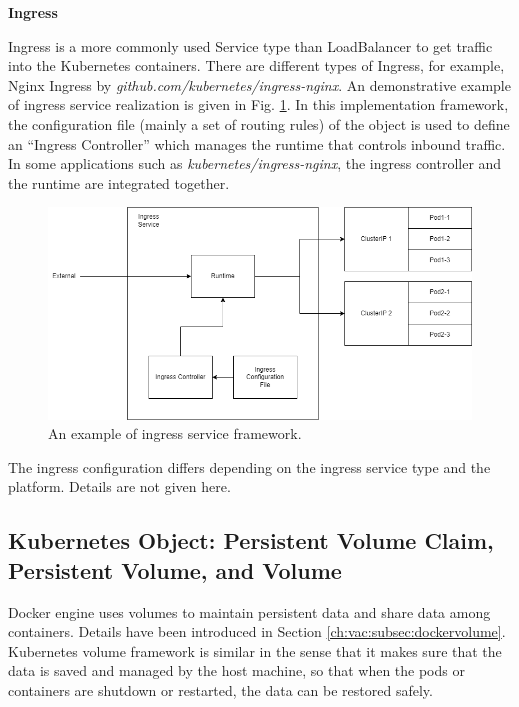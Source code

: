 \vspace{0.1in}
\noindent \textbf{Ingress}
\vspace{0.1in}

Ingress is a more commonly used Service type than LoadBalancer to get traffic into the Kubernetes containers. There are different types of Ingress, for example, Nginx Ingress by \textit{github.com/kubernetes/ingress-nginx}. An demonstrative example of ingress service realization is given in Fig. \ref{ch:vac:fig:ingress_service}. In this implementation framework, the configuration file (mainly a set of routing rules) of the object is used to define an ``Ingress Controller'' which manages the runtime that controls inbound traffic. In some applications such as \textit{kubernetes/ingress-nginx}, the ingress controller and the runtime are integrated together.

\begin{figure}[htbp]
	\centering
	\includegraphics[width=350pt]{chapters/part-3/figures/ingress_service.png}
	\caption{An example of ingress service framework.} \label{ch:vac:fig:ingress_service}
\end{figure}

The ingress configuration differs depending on the ingress service type and the platform. Details are not given here.

\subsection{Kubernetes Object: Persistent Volume Claim, Persistent Volume, and Volume} \label{ch:vac:subsec:k8svolume}

Docker engine uses volumes to maintain persistent data and share data among containers. Details have been introduced in Section \ref{ch:vac:subsec:dockervolume}. Kubernetes volume framework is similar in the sense that it makes sure that the data is saved and managed by the host machine, so that when the pods or containers are shutdown or restarted, the data can be restored safely.


